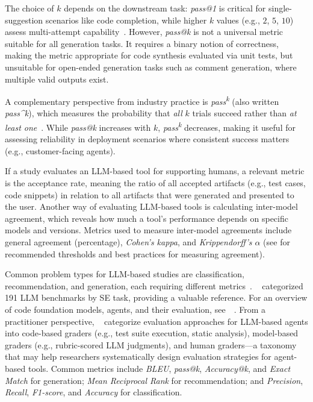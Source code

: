 The choice of $k$ depends on the downstream task: \emph{pass@1} is critical for single-suggestion scenarios like code completion, while higher $k$ values (e.g., $2$, $5$, $10$) assess multi-attempt capability~\cite{DBLP:journals/corr/abs-2308-12950, DBLP:journals/corr/abs-2401-14196, DBLP:journals/corr/abs-2409-12186, DBLP:journals/corr/abs-2305-06161}.
However, \emph{pass@k} is not a universal metric suitable for all generation tasks.
It requires a binary notion of correctness, making the metric appropriate for code synthesis evaluated via unit tests, but unsuitable for open-ended generation tasks such as comment generation, where multiple valid outputs exist.

A complementary perspective from industry practice is \emph{pass\textsuperscript{k}} (also written \emph{pass\^{}k}), which measures the probability that \emph{all} $k$ trials succeed rather than \emph{at least one}~\cite{Anthropic2025evals}. While \emph{pass@k} increases with $k$, \emph{pass\textsuperscript{k}} decreases, making it useful for assessing reliability in deployment scenarios where consistent success matters (e.g., customer-facing agents).

If a study evaluates an LLM-based tool for supporting humans, a relevant metric is the acceptance rate, meaning the ratio of all accepted artifacts (e.g., test cases, code snippets) in relation to all artifacts that were generated and presented to the user.
Another way of evaluating LLM-based tools is calculating inter-model agreement, which reveals how much a tool's performance depends on specific models and versions.
Metrics used to measure inter-model agreements include general agreement (percentage), \emph{Cohen's kappa}, and \emph{Krippendorff's $\alpha$} (see \humanvalidation for recommended thresholds and best practices for measuring agreement).

Common problem types for LLM-based studies are classification, recommendation, and generation, each requiring different metrics~\cite{10.1145/3695988}. \citeauthor{hu2025assessingadvancingbenchmarksevaluating}~\cite{hu2025assessingadvancingbenchmarksevaluating} categorized 191 LLM benchmarks by SE task, providing a valuable reference. For an overview of code foundation models, agents, and their evaluation, see~\citeauthor{yang2025code}~\cite{yang2025code}. From a practitioner perspective, \citeauthor{Anthropic2025evals}~\cite{Anthropic2025evals} categorize evaluation approaches for LLM-based agents into code-based graders (e.g., test suite execution, static analysis), model-based graders (e.g., rubric-scored LLM judgments), and human graders---a taxonomy that may help researchers systematically design evaluation strategies for agent-based tools. Common metrics include \emph{BLEU}, \emph{pass@k}, \emph{Accuracy@k}, and \emph{Exact Match} for generation; \emph{Mean Reciprocal Rank} for recommendation; and \emph{Precision}, \emph{Recall}, \emph{F1-score}, and \emph{Accuracy} for classification.

